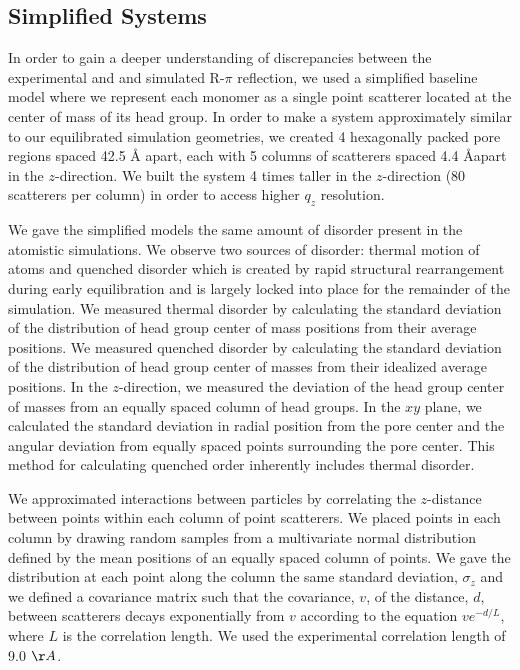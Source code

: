 \documentclass[journal=jpcbfk,manuscript=article]{achemso}
\begin{document}
  \subsection{Simplified Systems}\label{method:simple_systems}
  
  In order to gain a deeper understanding of discrepancies between the experimental and
  and simulated R-$\pi$ reflection, we used a simplified baseline model where we 
  represent each monomer as a single point scatterer located at the center of mass
  of its head group. In order to make a system approximately similar to our equilibrated 
  simulation geometries, we created 4 hexagonally packed pore regions spaced 42.5 \AA 
  apart, each with 5 columns of scatterers spaced 4.4 \AA apart in the $z$-direction. We
  built the system 4 times taller in the $z$-direction (80 scatterers per column) in order
  to access higher $q_z$ resolution.
  
  We gave the simplified models the same amount of disorder present in the atomistic
  simulations. We observe two sources of disorder: thermal motion of atoms
  and quenched disorder which is created by rapid structural rearrangement during 
  early equilibration and is largely locked into place for the remainder of the 
  simulation. We measured thermal disorder by calculating the standard deviation of 
  the distribution of head group center of mass positions from their average positions.
  We measured quenched disorder by calculating the standard deviation of the distribution
  of head group center of masses from their idealized average positions. In the 
  $z$-direction, we measured the deviation of the head group center of masses from an
  equally spaced column of head groups. In the $xy$ plane, we calculated the standard 
  deviation in radial position from the pore center and the angular deviation from 
  equally spaced points surrounding the pore center. This method for calculating 
  quenched order inherently includes thermal disorder. 
  
  We approximated interactions between particles by correlating the $z$-distance 
  between points within each column of point scatterers. We placed points in each
  column by drawing random samples from a multivariate normal distribution defined
  by the mean positions of an equally spaced column of points. We gave the 
  distribution at each point along the column the same standard deviation, 
  $\sigma_z$ and we defined a covariance matrix such that the covariance, $v$, of
  the distance, $d$, between scatterers decays exponentially from $v$ according
  to the equation $ve^{-d/L}$, where $L$ is the correlation length. We used the
  experimental correlation length of 9.0 $\AA$. 
  
\end{document}
